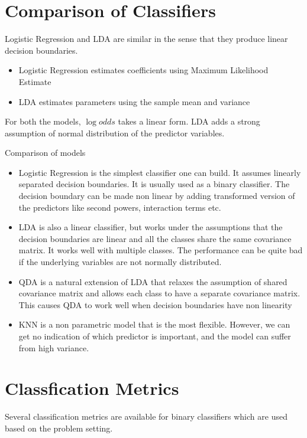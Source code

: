 \documentclass[../statistical_learning_notes.tex]{subfiles}
\begin{document}
    
    
    

    \section{Comparison of Classifiers}
    Logistic Regression and LDA are similar in the sense that they produce linear decision boundaries.
    \begin{itemize}
        \item Logistic Regression estimates coefficients using Maximum Likelihood Estimate
        \item LDA estimates parameters using the sample mean and variance
    \end{itemize}
    For both the models, $\log {odds}$ takes a linear form. LDA adds a strong assumption of normal distribution of the predictor variables.\newline
    
    Comparison of models
    \begin{itemize}
        \item Logistic Regression is the simplest classifier one can build. It assumes linearly separated decision boundaries. It is usually used as a binary classifier. The decision boundary can be made non linear by adding transformed version of the predictors like second powers, interaction terms etc.
        \item LDA is also a linear classifier, but works under the assumptions that the decision boundaries are linear and all the classes share the same covariance matrix. It works well with multiple classes. The performance can be quite bad if the underlying variables are not normally distributed.
        \item QDA is a natural extension of LDA that relaxes the assumption of shared covariance matrix and allows each class to have a separate covariance matrix. This causes QDA to work well when decision boundaries have non linearity
        \item KNN is a non parametric model that is the most flexible. However, we can get no indication of which predictor is important, and the model can suffer from high variance.
    \end{itemize}


    \section{Classfication Metrics}
    Several classification metrics are available for binary classifiers which are used based on the problem setting.
\end{document}
